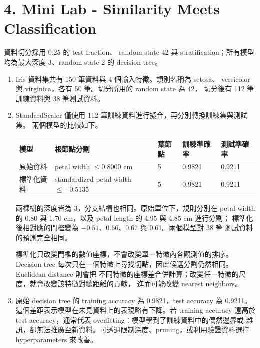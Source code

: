\section*{4. Mini Lab - Similarity Meets Classification}

資料切分採用 0.25 的 test fraction、
random state 42 與 stratification；所有模型均為最大深度 3、random state 2 的
decision tree。

\begin{enumerate}
  \item Iris 資料集共有 150 筆資料與 4 個輸入特徵。類別名稱為 setosa、
  versicolor 與 virginica，各有 50 筆。切分所用的 random state 為 42，
  切分後有 112 筆訓練資料與 38 筆測試資料。

  \item StandardScaler 僅使用 112 筆訓練資料進行擬合，再分別轉換訓練集與測試集。
  兩個模型的比較如下。

  \begin{center}
  \small
  \begin{tabular}{lllll}
    \toprule
    模型 & 根節點分割 & 葉節點 & 訓練準確率 & 測試準確率 \\
    \midrule
    原始資料 & petal width $\leq 0.8000$ cm & 5 & 0.9821 & 0.9211 \\
    標準化資料 & standardized petal width $\leq -0.5135$ & 5 & 0.9821 & 0.9211 \\
    \bottomrule
  \end{tabular}
  \end{center}

  兩棵樹的深度皆為 3，分支結構也相同。原始單位下，規則分別在 petal width
  的 0.80 與 1.70 cm，以及 petal length 的 4.95 與 4.85 cm 進行分割；
  標準化後相對應的門檻變為 $-0.51$、0.66、0.67 與 0.61。兩個模型對 38 筆
  測試資料的預測完全相同。

  標準化只改變門檻的數值座標，不會改變單一特徵內各觀測值的排序。Decision tree
  每次只在一個特徵上尋找切點，因此候選分割仍然相同。Euclidean distance 則會把
  不同特徵的座標差合併計算；改變任一特徵的尺度，就會改變該特徵對總距離的貢獻，
  進而可能改變 nearest neighbors。

  \item 原始 decision tree 的 training accuracy 為 0.9821，test accuracy
  為 0.9211。這個差距表示模型在未見資料上的表現略有下降。若 training accuracy
  遠高於 test accuracy，通常代表 overfitting：模型學到了訓練資料中的偶然邊界或
  雜訊，卻無法推廣至新資料。可透過限制深度、pruning，或利用驗證資料選擇
  hyperparameters 來改善。


\end{enumerate}
